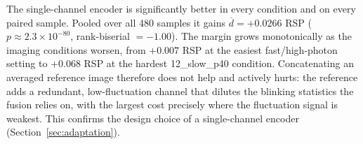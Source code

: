 
The single-channel encoder is significantly better in every condition and on
every paired sample. Pooled over all 480 samples it gains $\overline{d} = +0.0266$
RSP ($p \approx 2.3\times10^{-80}$, rank-biserial $=-1.00$). The margin grows monotonically
as the imaging conditions worsen, from $+0.007$ RSP at the easiest fast/high-photon
setting to $+0.068$ RSP at the hardest 12\_slow\_p40 condition. Concatenating an
averaged reference image therefore does not help and actively hurts: the reference
adds a redundant, low-fluctuation channel that dilutes the blinking statistics the
fusion relies on, with the largest cost precisely where the fluctuation signal is
weakest. This confirms the design choice of a single-channel encoder
(Section~\ref{sec:adaptation}).


